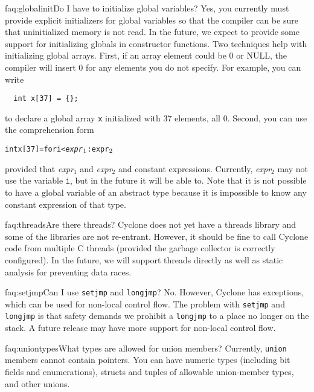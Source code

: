 \begin{faqa}{faq:globalinit}{Do I have to initialize global variables?}
Yes, you currently must provide explicit initializers for global
variables so that the compiler can be sure that uninitialized
memory is not read.  In the future, we expect to provide some support
for initializing globals in constructor functions.  Two techniques
help with initializing global arrays.  First, if an array element
could be 0 or NULL, the compiler will insert 0 for any elements you do
not specify.  For example, you can write
\begin{verbatim}
  int x[37] = {};
\end{verbatim}
to declare a global array \texttt{x} initialized with 37 elements, all 0.
Second, you can use
the comprehension form
\begin{alltt}
  int x[37] = \lb for i < \textit{expr}\(\sb{1}\) : \texttt{expr}\(\sb{2}\) \rb
\end{alltt}
provided that 
\textit{expr}$_1$ and
\textit{expr}$_2$ and
constant expressions.
Currently, \textit{expr}$_2$ may not use the variable \texttt{i}, but
in the future it will be able to.  Note that it is not possible to
have a global variable of an abstract type because it is impossible to
know any constant expression of that type.
\end{faqa}

\begin{faqa}{faq:threads}{Are there threads?}
Cyclone does not yet have a threads library and some of the libraries
are not re-entrant.  However, it should be fine to call Cyclone code
from multiple C threads (provided the garbage collector is correctly
configured).  In the future, we will support threads directly as well
as static analysis for preventing data races.
\end{faqa}

\begin{faqa}{faq:setjmp}{Can I use \texttt{setjmp} and \texttt{longjmp}?}
No.  However, Cyclone has exceptions, which can be used for non-local
control flow.  The problem with \texttt{setjmp} and \texttt{longjmp}
is that safety demands we prohibit a \texttt{longjmp} to a place no
longer on the stack.  A future release may have more support for
non-local control flow.
\end{faqa}

\begin{faqa}{faq:uniontypes}{What types are allowed for union members?}
Currently, \texttt{union} members cannot contain pointers.  You can
have numeric types (including bit fields and enumerations), structs
and tuples of allowable union-member types, and other unions.
\end{faqa}

